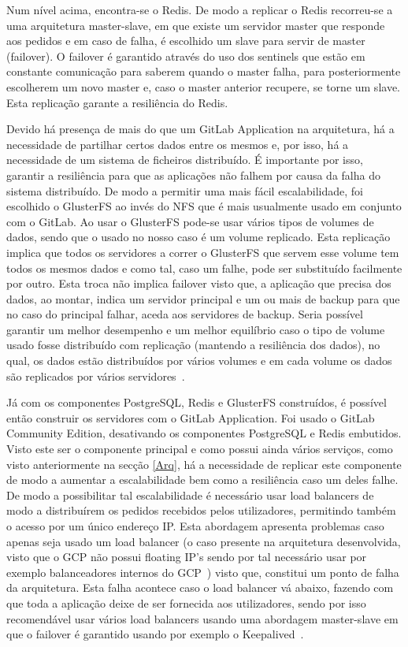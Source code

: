 \documentclass{article}
\begin{document}
Num nível acima, encontra-se o Redis. De modo a replicar o Redis recorreu-se a uma arquitetura master-slave, em que existe um servidor master que responde aos pedidos e em caso de falha, é escolhido um slave para servir de master (failover). O failover é garantido através do uso dos sentinels que estão em constante comunicação para saberem quando o master falha, para posteriormente escolherem um novo master e, caso o master anterior recupere, se torne um slave. Esta replicação garante a resiliência do Redis.

Devido há presença de mais do que um GitLab Application na arquitetura, há a necessidade de partilhar certos dados entre os mesmos e, por isso, há a necessidade de um sistema de ficheiros distribuído. É importante por isso, garantir a resiliência para que as aplicações não falhem por causa da falha do sistema distribuído. De modo a permitir uma mais fácil escalabilidade, foi escolhido o GlusterFS ao invés do NFS que é mais usualmente usado em conjunto com o GitLab. Ao usar o GlusterFS pode-se usar vários tipos de volumes de dados, sendo que o usado no nosso caso é um volume replicado. Esta replicação implica que todos os servidores a correr o GlusterFS que servem esse volume tem todos os mesmos dados e como tal, caso um falhe, pode ser substituído facilmente por outro. Esta troca não implica failover visto que, a aplicação que precisa dos dados, ao montar, indica um servidor principal e um ou mais de backup para que no caso do principal falhar, aceda aos servidores de backup. Seria possível garantir um melhor desempenho e um melhor equilíbrio caso o tipo de volume usado fosse distribuído com replicação (mantendo a resiliência dos dados), no qual, os dados estão distribuídos por vários volumes e em cada volume os dados são replicados por vários servidores~\cite{archGluster}. 

Já com os componentes PostgreSQL, Redis e GlusterFS construídos, é possível então construir os servidores com o GitLab Application. Foi usado o GitLab Community Edition, desativando os componentes PostgreSQL e Redis embutidos. Visto este ser o componente principal e como possui ainda vários serviços, como visto anteriormente na secção \ref{Arq}, há a necessidade de replicar este componente de modo a aumentar a escalabilidade bem como a resiliência caso um deles falhe. De modo a possibilitar tal escalabilidade é necessário usar load balancers de modo a distribuírem os pedidos recebidos pelos utilizadores, permitindo também o acesso por um único endereço IP. Esta abordagem apresenta problemas caso apenas seja usado um load balancer (o caso presente na arquitetura desenvolvida, visto que o GCP não possui floating IP's sendo por tal necessário usar por exemplo balanceadores internos do GCP~\cite{floatIP}) visto que, constitui um ponto de falha da arquitetura. Esta falha acontece caso o load balancer vá abaixo, fazendo com que toda a aplicação deixe de ser fornecida aos utilizadores, sendo por isso recomendável usar vários load balancers usando uma abordagem master-slave em que o failover é garantido usando por exemplo o Keepalived~\cite{keepalivedConf,keepalivedNg}.
\end{document}
